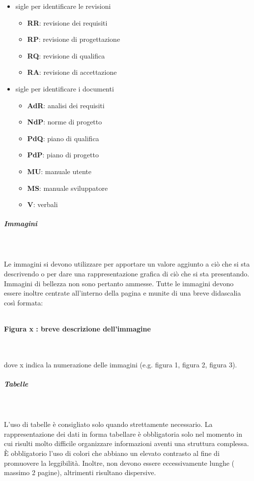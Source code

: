 \documentclass[../norme-di-progetto.tex]{subfiles}
\begin{document}
\begin{itemize}
  \item sigle per identificare le revisioni
  \begin{itemize}
    \item \textbf{RR}: revisione dei requisiti
    \item \textbf{RP}: revisione di progettazione
    \item \textbf{RQ}: revisione di qualifica
    \item \textbf{RA}: revisione di accettazione
  \end{itemize}
  \item sigle per identificare i documenti
  \begin{itemize}
    \item \textbf{AdR}: analisi dei requisiti
    \item \textbf{NdP}: norme di progetto
    \item \textbf{PdQ}: piano di qualifica
    \item \textbf{PdP}: piano di progetto
    \item \textbf{MU}: manuale utente
    \item \textbf{MS}: manuale sviluppatore
    \item \textbf{V}: verbali
   \end{itemize}
 \end{itemize}
\subparagraph{Immagini}\mbox{}\\
\label{subp:immagini}
\\Le immagini si devono utilizzare per apportare un valore aggiunto a ciò che si sta descrivendo o per dare una rappresentazione grafica di ciò che si sta presentando.
Immagini di bellezza non sono pertanto ammesse.
Tutte le immagini devono essere inoltre centrate all'interno della pagina e munite di una breve didascalia così formata: \\\\\centerline{\textbf{Figura x : breve descrizione dell'immagine}} \\\\ dove x indica la numerazione delle immagini (e.g. figura 1, figura 2, figura 3).

\subparagraph{Tabelle}\mbox{}\\
\label{subp:tabelle}
\\L'uso di tabelle è consigliato solo quando strettamente necessario. La rappresentazione dei dati in forma tabellare è obbligatoria solo nel momento in cui risulti molto difficile organizzare informazioni aventi una struttura complessa. È obbligatorio l'uso di colori che abbiano un elevato contrasto al fine di promuovere la leggibilità. Inoltre, non devono essere eccessivamente lunghe ( massimo 2 pagine), altrimenti risultano dispersive.
\end{document}
